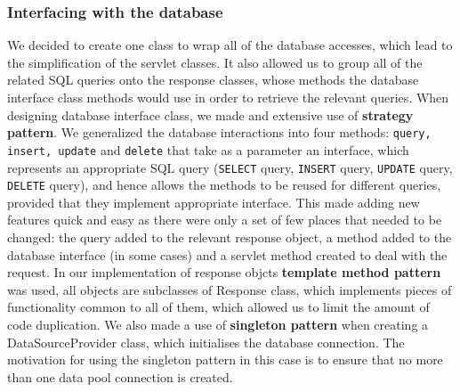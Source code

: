 \documentclass[10pt,a4paper]{article}
\begin{document}
\subsubsection{Interfacing with the database}
\noindent We decided to create one class to wrap all of the database accesses, which lead to the simplification of the servlet classes. It also allowed us to group all of the related SQL queries onto the response classes, whose methods the database interface class methods would use in order to retrieve the relevant queries. When designing database interface class, we made and extensive use of \textbf{strategy pattern}. We generalized the database interactions into four methods: \verb|query, insert, update| and \verb|delete| that take as a parameter an interface, which represents an appropriate SQL query (\verb|SELECT| query, \verb|INSERT| query, \verb|UPDATE| query, \verb|DELETE| query), and hence allows the methods to be reused for different queries, provided that they implement appropriate interface. This made adding new features quick and easy as there were only a set of few places that needed to be changed: the query added to the relevant response object, a method added to the database interface (in some cases) and a servlet method created to deal with the request. In our implementation of response objcts \textbf{template method pattern} was used, all objects are subclasses of Response class, which implements pieces of functionality common to all of them, which allowed us to limit the amount of code duplication. We also made a use of \textbf{singleton pattern} when creating a DataSourceProvider class, which initialises the database connection. The motivation for using the singleton pattern in this case is to ensure that no more than one data pool connection is created. 
\end{document}
